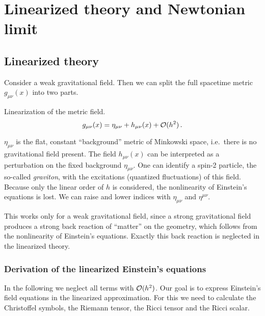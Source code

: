 \chapter{Linearized theory and Newtonian limit}
\section{Linearized theory}
Consider a weak gravitational field. Then we can split the full spacetime metric $g_{\mu\nu}(x)$ into two parts.
\begin{definition}{Linearization of the metric field.}
    \begin{equation}
        g_{\mu\nu}(x) = \eta_{\mu\nu} + h_{\mu\nu}(x) + \mathcal{O}(h^2) \, .
    \end{equation}
\end{definition}
$\eta_{\mu\nu}$ is the flat, constant ``background'' metric of Minkowski space, i.e.\ there is no gravitational field present.
The field $h_{\mu\nu}(x)$ can be interpreted as a perturbation on the fixed background $\eta_{\mu\nu}$.
One can identify a spin-2 particle, the so-called \emph{graviton}, with the excitations (quantized fluctuations) of this field.
Because only the linear order of $h$ is considered, the nonlinearity of Einstein's equations is lost.
We can raise and lower indices with $\eta_{\mu\nu}$ and $\eta^{\mu\nu}$.

\begin{remark}
This works only for a weak gravitational field, since a strong gravitational field produces a strong back reaction of ``matter''
on the geometry, which follows from the nonlinearity of Einstein's equations.
Exactly this back reaction is neglected in the linearized theory.
\end{remark}

\subsection{Derivation of the linearized Einstein's equations}
In the following we neglect all terms with $\mathcal{O}(h^2)$.
Our goal is to express Einstein's field equations in the linearized approximation.
For this we need to calculate the Christoffel symbols, the Riemann tensor, the Ricci tensor and the Ricci scalar.

